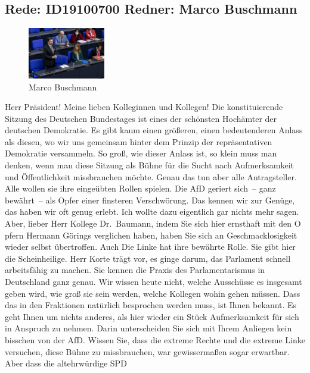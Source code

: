 \documentclass[a4paper,11pt]{article}
\begin{document}
\subsection{Rede: ID19100700  Redner: Marco Buschmann}

\begin{figure}[ht]

\centering

\includegraphics[width=0.3\textwidth]{Marco_Buschmann.jpg}

\caption{Marco Buschmann}

\end{figure}

Herr Präsident! Meine lieben Kolleginnen und Kollegen! Die konstituierende Sitzung des Deutschen Bundestages ist eines der schönsten Hochämter der deutschen Demokratie. Es gibt kaum einen größeren, einen bedeutenderen Anlass als diesen, wo wir uns gemeinsam hinter dem Prinzip der repräsentativen Demokratie versammeln. So groß, wie dieser Anlass ist, so klein muss man denken, wenn man diese Sitzung als Bühne für die Sucht nach Aufmerksamkeit und Öffentlichkeit missbrauchen möchte. Genau das tun aber alle Antragsteller. Alle wollen sie ihre eingeübten Rollen spielen. Die AfD geriert sich – ganz bewährt – als Opfer einer finsteren Verschwörung. Das kennen wir zur Genüge, das haben wir oft genug erlebt. Ich wollte dazu eigentlich gar nichts mehr sagen. Aber, lieber Herr Kollege Dr. Baumann, indem Sie sich hier ernsthaft mit den O pfern Hermann Görings verglichen haben, haben Sie sich an Geschmacklosigkeit wieder selbst übertroffen. Auch Die Linke hat ihre bewährte Rolle. Sie gibt hier die Scheinheilige. Herr Korte trägt vor, es ginge darum, das Parlament schnell arbeitsfähig zu machen. Sie kennen die Praxis des Parlamentarismus in Deutschland ganz genau. Wir wissen heute nicht, welche Ausschüsse es insgesamt geben wird, wie groß sie sein werden, welche Kollegen wohin gehen müssen. Dass das in den Fraktionen natürlich besprochen werden muss, ist Ihnen bekannt. Es geht Ihnen um nichts anderes, als hier wieder ein Stück Aufmerksamkeit für sich in Anspruch zu nehmen. Darin unterscheiden Sie sich mit Ihrem Anliegen kein bisschen von der AfD. Wissen Sie, dass die extreme Rechte und die extreme Linke versuchen, diese Bühne zu missbrauchen, war gewissermaßen sogar erwartbar. Aber dass die altehrwürdige SPD
\end{document}
